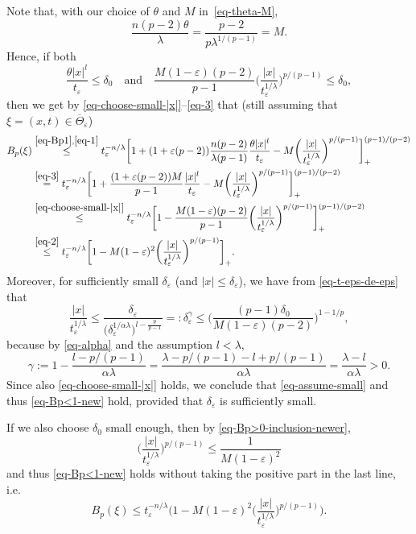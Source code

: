 \documentclass[a4paper, twoside]{article}
\makeatletter
\theoremstyle{propositional}
\theoremstyle{descriptive}
\renewenvironment{proof}[1][\proofname]{\par
  \pushQED{\qed}%
  \normalfont
  \trivlist
  \item[\hskip\labelsep
        \itshape
    #1\@addpunct{.}]\ignorespaces
}{%
  \popQED\endtrivlist\@endpefalse
}
\numberwithin{equation}{section}
\newcommand{\eps}{\varepsilon}
\newcommand{\al}{\alpha}
\newcommand{\de}{\delta}
\newcommand{\ga}{\gamma}
\newcommand{\la}{\lambda}
\newcommand{\os}[2]{\overset{#1}{#2}}
\makeatother
\begin{document}
\begin{proof}
Note that, with our choice of $\theta$ and $M$  in~\eqref{eq-theta-M},
\begin{equation} \label{eq-3}
\frac{n(p-2)\theta}{\la } = \frac{p-2}{p \la^{1/(p-1)} } = M.
\end{equation}
Hence, if both
\begin{equation}    \label{eq-assume-small}
\frac{\theta |x|^l}{t_\eps} \le \de_0
\quad \text{and} \quad
\frac{M(1-\eps)(p-2)}{p-1}  \biggl( \frac{|x|}{t_\eps^{1/\la}} \biggr)^{p/(p-1)} \le \de_0,
\end{equation}
then we get by 
\eqref{eq-choose-small-|x|}--\eqref{eq-3}
that (still assuming that $\xi=(x,t)\in \overline{\Theta}_\eps$)
\begin{align}
B_p(\xi) 
&\os{\eqref{eq-Bp1},\eqref{eq-1}}{\le}  t_\eps^{-n/\la}  \biggl[ 1 + (1+\eps(p-2))
     \frac {n(p-2)}{\la (p-1)} \frac{\theta|x|^l}{t_\eps} - M
\biggl( \frac{|x|}{t_\eps^{1/\la}} \biggr)^{p/(p-1)} \biggr]_{+}^{(p-1)/(p-2)} \nonumber \\
&\os{\eqref{eq-3}}{=}  t_\eps^{-n/\la}  \biggl[ 1 +        \frac{(1+\eps(p-2))M}{p-1} \frac{|x|^l}{t_\eps} - M
               \biggl( \frac{|x|}{t_\eps^{1/\la}} \biggr)^{p/(p-1)} \biggr]_{+}^{(p-1)/(p-2)} \nonumber \\
&\os{\eqref{eq-choose-small-|x|}}{\le} t_\eps^{-n/\la}  \biggl[ 1 - \frac{M(1-\eps)(p-2)}{p-1}
\biggl( \frac{|x|}{t_\eps^{1/\la}} \biggr)^{p/(p-1)} \biggr]_{+}^{(p-1)/(p-2)} \nonumber \\  
&\os{\eqref{eq-2}}{\le} t_\eps^{-n/\la}  \biggl[ 1 - M(1-\eps)^2
\biggl( \frac{|x|}{t_\eps^{1/\la}} \biggr)^{p/(p-1)} \biggr]_{+}. 
\label{eq-Bp<1-new}
\end{align}
Moreover, for sufficiently small $\de_\eps$ (and $|x|\le \de_\eps$),   
we have from \eqref{eq-t-eps-de-eps} that
\begin{equation} \label{eq-Bp>0-inclusion-newer}
\frac{|x|}{t_\eps^{1/\la}} \le
\frac{\de_\eps}{ \bigl(\de_\eps^{1/\al\la} \bigr)^{l-\frac{p}{p-1}} }  
=: \de_\eps^\ga
\le \biggl(  \frac{(p-1)\de_0}{M(1-\eps)(p-2)}  \biggr)^{1-1/p},
\end{equation}
because by \eqref{eq-alpha} and the assumption $l < \la$,
\[
\ga := 1-  \frac{l-p/(p-1)}{\al \la} 
= \frac{\la - p/(p-1) - l +p/(p-1)}{\al \la}
= \frac{\la - l}{\al \la}
> 0.
\]
Since also \eqref{eq-choose-small-|x|} holds, we conclude that
\eqref{eq-assume-small} and thus
\eqref{eq-Bp<1-new} hold, provided that 
$\de_\eps $ is sufficiently small.

If we also choose $\de_0$ small  enough, then  by
\eqref{eq-Bp>0-inclusion-newer},
\begin{equation*} %
\biggl(\frac{|x|}{t_\eps^{1/\la}}\biggr)^{p/(p-1)}
\le  \frac{1}{M(1-\eps)^2} 
\end{equation*}
and thus \eqref{eq-Bp<1-new} holds without taking
the positive part in the last line, i.e.
\begin{equation}
B_p(\xi) 
\le t_\eps^{-n/\la}  \biggl( 1 - M(1-\eps)^2
\biggl( \frac{|x|}{t_\eps^{1/\la}} \biggr)^{p/(p-1)} \biggr). 
\label{eq-Bp<1-newer}
\end{equation}



\end{proof}
\end{document}
